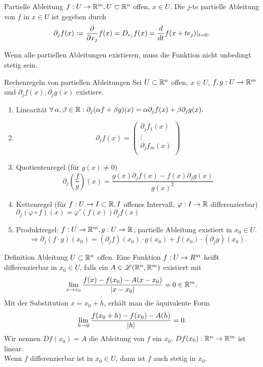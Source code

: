 \documentclass[main.tex]{subfiles}
\begin{document}
\begin{karte}{Partielle Ableitung}
    \( f : U \rightarrow \mathbb{R}^m, U \subset \mathbb{R}^n \) offen, \( x\in U \).
    Die \(j\)-te partielle Ableitung von \(f\) in \(x \in U\) 
    ist gegeben durch
    \[ \partial_j f(x) := \frac{\partial}{\partial x_j} f(x) 
    = D_{e_j} f(x) = \frac{d}{dt} f(x + t e_j) \vert_{t=0}. \]

    Wenn alle partiellen Ableitungen existieren, muss die Funktion 
    nicht unbedingt stetig sein.
\end{karte}
\begin{karte}{Rechenregeln von partiellen Ableitungen}
    Sei \( U \subset \mathbb{R}^n \) offen, \( x\in U \), 
    \( f,g : U \rightarrow \mathbb{R}^m \) und 
    \( \partial_j f(x), \partial_j g(x) \) existiere.
    \begin{enumerate}
        \item Linearität \( \forall \alpha, \beta \in \R: 
        \partial_j (\alpha f + \beta g)(x) 
        = \alpha \partial_j f(x) + \beta \partial_j g(x). \)
        \item \[ \partial_j f(x) = \begin{pmatrix}
            \partial_j f_1(x) \\
            \vdots \\
            \partial_j f_m(x) \\
        \end{pmatrix} \]
        \item Quotientenregel (für \( g(x) \neq 0 \))
        \[ \partial_j \left(\frac{f}{g}\right)(x) 
        = \frac{g(x) \partial_j f(x) - f(x) \partial_j g(x)}{g(x)^2} \]
        \item Kettenregel (für \( f : U \rightarrow I \subset \mathbb{R}, 
        I \) offenes Intervall, 
        \( \varphi : I \rightarrow \mathbb{R} \) differenzierbar)
        \( \partial_j (\varphi \circ f)(x) 
        = \varphi'(f(x)) \partial_j f(x) \)
        \item Produktregel: \( f : U \rightarrow \mathbb{R}^m, 
        g : U \rightarrow \mathbb{R} \), partielle Ableitung 
        existiert in \( x_0 \in U \).
        \[ \Rightarrow \partial_j(f\cdot g)(x_0) 
        = (\partial_j f)(x_0)\cdot g(x_0) + f(x_0)\cdot (\partial_j g)(x_0). \]
    \end{enumerate}
\end{karte}

\begin{karte}{Definition Ableitung}
    \( U \subset \mathbb{R}^n \) offen. Eine Funktion \(f : U \rightarrow R^m\)
    heißt differenzierbar in \(x_0 \in U\), falls ein
    \( A \in \mathscr{L}(\mathbb{R}^n, \mathbb{R}^m) \) existiert mit
    \[ \lim\limits_{x\rightarrow x_0} \frac{f(x) -f(x_0) - A(x-x_0)}{\left| x-x_0 \right|} 
    = 0 \in \mathbb{R}^m. \]
    Mit der Substitution \( x = x_0 + h \), 
    erhält man die äquivalente Form 
    \[ \lim\limits_{h\rightarrow 0} \frac{ f(x_0 + h) - f(x_0) - A(h) }{\left| h \right|} = 0. \]
    Wir nennen \( Df(x_0) = A \) die Ableitung von \(f\) ein \(x_0\). 
    \( Df(x_0) : \mathbb{R}^n \rightarrow \mathbb{R}^m \) ist linear.\\
    Wenn \( f \) differenzierbar ist in \( x_0 \in U \), dann ist 
    \( f \) auch stetig in \( x_0 \).
\end{karte}
\end{document}
